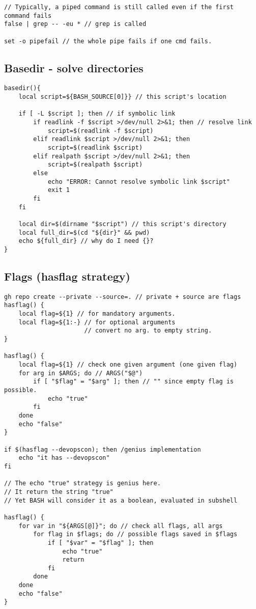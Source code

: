 \begin{verbatim}
// Typically, a piped command is still called even if the first command fails
false | grep -- -eu * // grep is called

set -o pipefail // the whole pipe fails if one cmd fails. 
\end{verbatim}

\subsection{Basedir - solve directories}

\begin{verbatim}
basedir(){
    local script=${BASH_SOURCE[0]}} // this script's location

    if [ -L $script ]; then // if symbolic link
        if readlink -f $script >/dev/null 2>&1; then // resolve link
            script=$(readlink -f $script)
        elif readlink $script >/dev/null 2>&1; then
            script=$(readlink $script)
        elif realpath $script >/dev/null 2>&1; then
            script=$(realpath $script)
        else
            echo "ERROR: Cannot resolve symbolic link $script"
            exit 1 
        fi
    fi

    local dir=$(dirname "$script") // this script's directory
    local full_dir=$(cd "${dir}" && pwd)
    echo ${full_dir} // why do I need {}?
}

\end{verbatim}

\subsection{Flags (hasflag strategy)}

\begin{verbatim}
gh repo create --private --source=. // private + source are flags
hasflag() {
    local flag=${1} // for mandatory arguments. 
    local flag=${1:-} // for optional arguments
                      // convert no arg. to empty string. 
}

hasflag() {
    local flag=${1} // check one given argument (one given flag)
    for arg in $ARGS; do // ARGS("$@")
        if [ "$flag" = "$arg" ]; then // "" since empty flag is possible.
            echo "true"
        fi
    done
    echo "false"
}

if $(hasflag --devopscon); then /genius implementation
    echo "it has --devopscon"
fi

// The echo "true" strategy is genius here. 
// It return the string "true"
// Yet BASH will consider it as a boolean, evaluated in subshell

hasflag() {
    for var in "${ARGS[@]}"; do // check all flags, all args
        for flag in $flags; do // possible flags saved in $flags
            if [ "$var" = "$flag" ]; then
                echo "true"
                return
            fi
        done
    done
    echo "false"
}
\end{verbatim}

